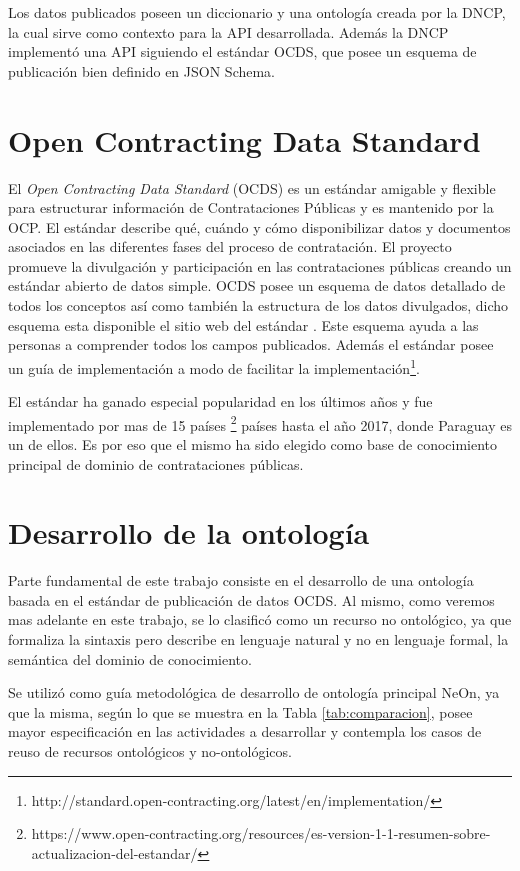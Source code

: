 Los datos publicados poseen un diccionario y una ontología creada por la DNCP, la cual sirve como contexto para la API desarrollada. Además la DNCP implementó una API siguiendo el estándar OCDS, que posee un esquema de publicación bien definido en JSON Schema.


\section{Open Contracting Data Standard}
\label{section:OCDS}

El \textit{Open Contracting Data Standard} (OCDS) es un estándar amigable y flexible para estructurar información de Contrataciones Públicas y es mantenido por la OCP. El estándar describe qué, cuándo y cómo disponibilizar datos y documentos asociados en las diferentes fases del proceso de contratación. El proyecto promueve la divulgación y participación en las contrataciones públicas creando un estándar abierto de datos simple. OCDS posee un esquema de datos detallado de todos los conceptos así como también la estructura de los datos divulgados, dicho esquema esta disponible el sitio web del estándar \cite{OCDSReleaseSchema:online}. Este esquema ayuda a las personas a comprender todos los campos publicados. Además el estándar posee un guía de implementación a modo de facilitar la implementación\footnote{http://standard.open-contracting.org/latest/en/implementation/}.

El estándar ha ganado especial popularidad en los últimos años y fue implementado por mas de 15 países \footnote{https://www.open-contracting.org/resources/es-version-1-1-resumen-sobre-actualizacion-del-estandar/} países hasta el año 2017, donde Paraguay es un de ellos. Es por eso que el mismo ha sido elegido como base de conocimiento principal de dominio de contrataciones públicas.

\section{Desarrollo de la ontología}
\label{section:desarrolloOntologia}

Parte fundamental de este trabajo consiste en el desarrollo de una ontología basada en el estándar de publicación de datos OCDS. Al mismo,  como veremos mas adelante en este trabajo, se lo clasificó como un recurso no ontológico, ya que formaliza la sintaxis pero describe en lenguaje natural y no en lenguaje formal, la semántica del dominio de conocimiento. 

Se utilizó como guía metodológica de desarrollo de ontología principal NeOn, ya que la misma, según lo que se muestra en la Tabla  \ref{tab:comparacion}, posee mayor especificación en las actividades a desarrollar  y contempla los casos de reuso de recursos ontológicos y no-ontológicos. 

